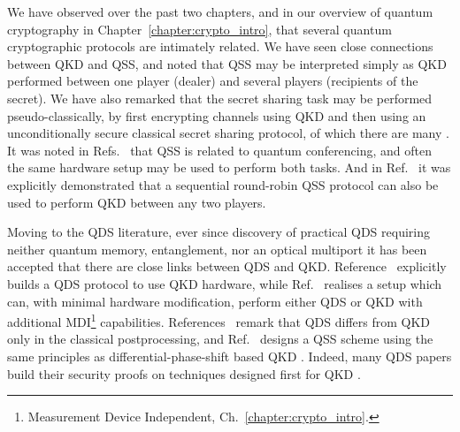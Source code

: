 We have observed over the past two chapters, and in our overview of quantum cryptography in Chapter~\ref{chapter:crypto_intro}, that several quantum cryptographic protocols are intimately related. We have seen close connections between QKD and QSS, and noted that QSS may be interpreted simply as QKD performed between one player (dealer) and several players (recipients of the secret). We have also remarked that the secret sharing task may be performed pseudo-classically, by first encrypting channels using QKD and then using an unconditionally secure classical secret sharing protocol, of which there are many \cite{Schneier1996}. It was noted in Refs.~\cite{Hillery1999, Chen2005a, Wu2016, Ottaviani2017b} that QSS is related to quantum conferencing, and often the same hardware setup may be used to perform both tasks. And in Ref.~\cite{Grice2019} it was explicitly demonstrated that a sequential round-robin QSS protocol can also be used to perform QKD between any two players. 

Moving to the QDS literature, ever since discovery of practical QDS requiring neither quantum memory, entanglement, nor an optical multiport it has been accepted that there are close links between QDS and QKD. Reference~\cite{Wallden2015} explicitly builds a QDS protocol to use QKD hardware, while Ref.~\cite{Roberts2017} realises a setup which can, with minimal hardware modification, perform either QDS or QKD with additional MDI\footnote{Measurement Device Independent, Ch.~\ref{chapter:crypto_intro}.} capabilities. References~\cite{Collins2016, Yin2017, Yin2017c, An2019, Roberts2017} remark that QDS differs from QKD only in the classical postprocessing, and Ref.~\cite{Wei2018} designs a QSS scheme using the same principles as differential-phase-shift based QKD \cite{Sasaki2014}. Indeed, many QDS papers build their security proofs on techniques designed first for QKD \cite{Kogias2017, Grice2019, Wei2018, Grice2015, Armstrong2015}.



